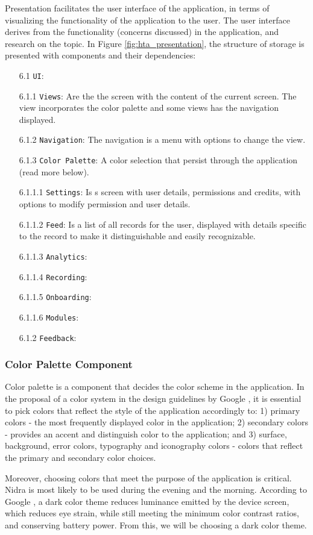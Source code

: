 Presentation facilitates the user interface of the application, in terms of visualizing the functionality of the application to the user. The user interface derives from the functionality (concerns discussed) in the application, and research on the topic. In Figure \ref{fig:hta_presentation}, the structure of storage is presented with components and their dependencies: 

\begin{itemize}
    \item[6.1] \verb|UI|: 
    \item[6.1.1] \verb|Views|: Are the the screen with the content of the current screen. The view incorporates the color palette and some views has the navigation displayed. 
    \item[6.1.2] \verb|Navigation|: The navigation is a menu with options to change the view. 
    \item[6.1.3] \verb|Color Palette|: A color selection that persist through the application (read more below).
    \item[6.1.1.1] \verb|Settings|: Is s screen with user details, permissions and credits, with options to modify permission and user details.
    \item[6.1.1.2] \verb|Feed|: Is a list of all records for the user, displayed with details specific to the record to make it distinguishable and easily recognizable. 
    \item[6.1.1.3] \verb|Analytics|: 
    \item[6.1.1.4] \verb|Recording|:
    \item[6.1.1.5] \verb|Onboarding|: 
    \item[6.1.1.6] \verb|Modules|: 
    \item[6.1.2] \verb|Feedback|:
\end{itemize}

\subsubsection{Color Palette Component}
Color palette is a component that decides the color scheme in the application. In the proposal of a color system in the design guidelines by Google \cite{colorsystem}, it is essential to pick colors that reflect the style of the application accordingly to: 1) primary colors - the most frequently displayed color in the application; 2) secondary colors - provides an accent and distinguish color to the application; and 3) surface, background, error colors, typography and iconography colors - colors that reflect the primary and secondary color choices. 

Moreover, choosing colors that meet the purpose of the application is critical. Nidra is most likely to be used during the evening and the morning. According to Google \cite{darktheme}, a dark color theme reduces luminance emitted by the device screen, which reduces eye strain, while still meeting the minimum color contrast ratios, and conserving battery power. From this, we will be choosing a dark color theme. 